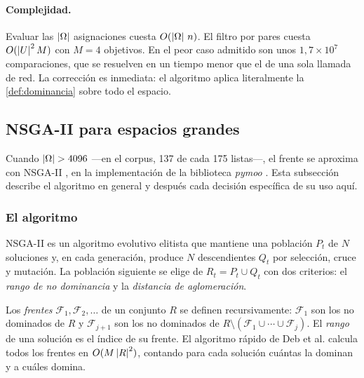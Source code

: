 \paragraph{Complejidad.} Evaluar las $\left\lvert \Omega \right\rvert$ asignaciones cuesta
$O(\left\lvert \Omega \right\rvert\,n)$. El filtro por pares cuesta $O(\left\lvert U \right\rvert^2M)$ con $M=4$
objetivos. En el peor caso admitido son unos $1{,}7\times10^7$ comparaciones,
que se resuelven en un tiempo menor que el de una sola llamada de red. La
corrección es inmediata: el algoritmo aplica literalmente la
\cref{def:dominancia} sobre todo el espacio.

\subsection{NSGA-II para espacios grandes}
\label{sec:opt-nsga}

Cuando $\left\lvert \Omega \right\rvert>4096$ ---en el corpus, 137 de cada 175 listas---, el frente
se aproxima con NSGA-II \cite{deb2002nsga2}, en la implementación de la
biblioteca \emph{pymoo} \cite{blank2020pymoo}. Esta subsección describe el
algoritmo en general y después cada decisión específica de su uso aquí.

\subsubsection{El algoritmo}

NSGA-II es un algoritmo evolutivo elitista que mantiene una población $P_t$ de
$N$ soluciones y, en cada generación, produce $N$ descendientes $Q_t$ por
selección, cruce y mutación. La población siguiente se elige de
$R_t=P_t\cup Q_t$ con dos criterios: el \emph{rango de no dominancia} y la
\emph{distancia de aglomeración}.

\begin{definicion}
Los \emph{frentes} $\mathcal{F}_1,\mathcal{F}_2,\dots$ de un conjunto $R$ se
definen recursivamente: $\mathcal{F}_1$ son los no dominados de $R$ y
$\mathcal{F}_{j+1}$ son los no dominados de
$R\setminus(\mathcal{F}_1\cup\cdots\cup\mathcal{F}_j)$. El \emph{rango} de una
solución es el índice de su frente. El algoritmo rápido de Deb et al.
\cite{deb2002nsga2} calcula todos los frentes en $O(M\left\lvert R \right\rvert^2)$, contando
para cada solución cuántas la dominan y a cuáles domina.
\end{definicion}

